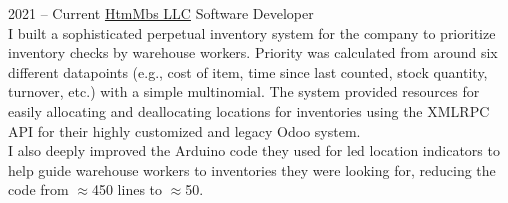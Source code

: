 \documentclass[9pt]{developercv} %
\begin{document}
\begin{entrylist}
    \entry
        {2021 -- Current}
        {\href{https://mbs-standoffs.com}{HtmMbs LLC}}
        {Software Developer}
        {
            \slashsep
            \slashsep
            \slashsep
            \slashsep
            \slashsep
            \slashsep
            \\
            I built a sophisticated perpetual inventory system for the company
            to prioritize inventory checks by warehouse workers. Priority was
            calculated from around six different datapoints (e.g., cost of item,
            time since last counted, stock quantity, turnover, etc.) with a
            simple multinomial. The system provided resources for easily
            allocating and deallocating locations for inventories using the
            XMLRPC API for their highly customized and legacy Odoo system.\\

            I also deeply improved the Arduino code they used for led location
            indicators to help guide warehouse workers to inventories they were
            looking for, reducing the code from $\approx$450 lines to
            $\approx$50.\\

}
\end{entrylist}
\end{document}
